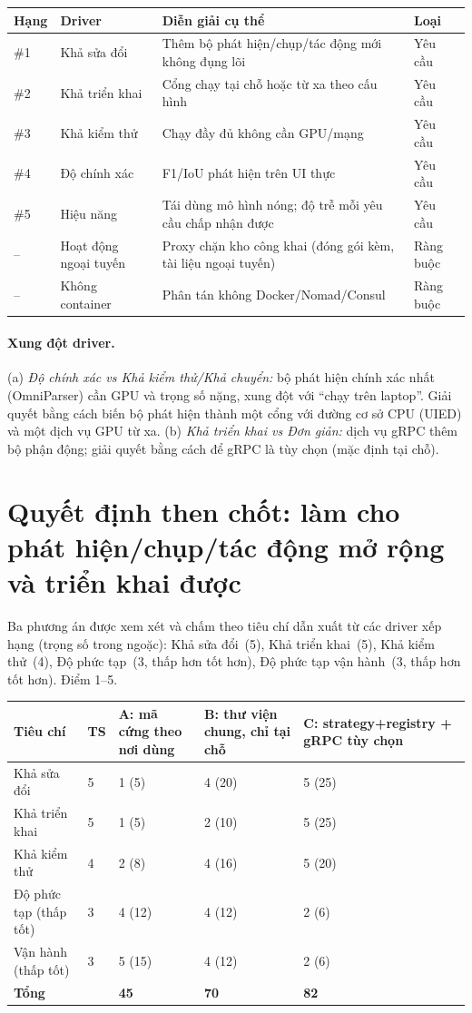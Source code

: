 \documentclass[11pt,a4paper]{report}
\begin{document}
\begin{longtable}{@{}p{0.8cm}p{2.8cm}p{7.4cm}p{2.4cm}@{}}
\toprule
\textbf{Hạng} & \textbf{Driver} & \textbf{Diễn giải cụ thể} & \textbf{Loại} \\
\midrule
\endhead
\#1 & Khả sửa đổi & Thêm bộ phát hiện/chụp/tác động mới không đụng lõi & Yêu cầu \\
\#2 & Khả triển khai & Cổng chạy tại chỗ hoặc từ xa theo cấu hình & Yêu cầu \\
\#3 & Khả kiểm thử & Chạy đầy đủ không cần GPU/mạng & Yêu cầu \\
\#4 & Độ chính xác & F1/IoU phát hiện trên UI thực & Yêu cầu \\
\#5 & Hiệu năng & Tái dùng mô hình nóng; độ trễ mỗi yêu cầu chấp nhận được & Yêu cầu \\
-- & Hoạt động ngoại tuyến & Proxy chặn kho công khai (đóng gói kèm, tài liệu ngoại tuyến) & Ràng buộc \\
-- & Không container & Phân tán không Docker/Nomad/Consul & Ràng buộc \\
\bottomrule
\end{longtable}

\paragraph{Xung đột driver.}
(a) \emph{Độ chính xác vs Khả kiểm thử/Khả chuyển:} bộ phát hiện chính xác nhất
(OmniParser) cần GPU và trọng số nặng, xung đột với ``chạy trên laptop''. Giải quyết
bằng cách biến bộ phát hiện thành một cổng với đường cơ sở CPU (UIED) và một dịch vụ
GPU từ xa. (b) \emph{Khả triển khai vs Đơn giản:} dịch vụ gRPC thêm bộ phận động;
giải quyết bằng cách để gRPC là tùy chọn (mặc định tại chỗ).

\section{Quyết định then chốt: làm cho phát hiện/chụp/tác động mở rộng và triển khai được}
Ba phương án được xem xét và chấm theo tiêu chí dẫn xuất từ các driver xếp hạng
(trọng số trong ngoặc): Khả sửa đổi~(5), Khả triển khai~(5), Khả kiểm thử~(4), Độ
phức tạp~(3, thấp hơn tốt hơn), Độ phức tạp vận hành~(3, thấp hơn tốt hơn). Điểm 1--5.

\begin{longtable}{@{}p{5.2cm}p{1.2cm}p{2.2cm}p{2.2cm}p{2.2cm}@{}}
\toprule
\textbf{Tiêu chí} & \textbf{TS} & \textbf{A: mã cứng theo nơi dùng} & \textbf{B: thư viện chung, chỉ tại chỗ} & \textbf{C: strategy+registry + gRPC tùy chọn} \\
\midrule
\endhead
Khả sửa đổi & 5 & 1 (5) & 4 (20) & 5 (25) \\
Khả triển khai & 5 & 1 (5) & 2 (10) & 5 (25) \\
Khả kiểm thử & 4 & 2 (8) & 4 (16) & 5 (20) \\
Độ phức tạp (thấp tốt) & 3 & 4 (12) & 4 (12) & 2 (6) \\
Vận hành (thấp tốt) & 3 & 5 (15) & 4 (12) & 2 (6) \\
\midrule
\textbf{Tổng} & & \textbf{45} & \textbf{70} & \textbf{82} \\
\bottomrule
\end{longtable}
\end{document}
